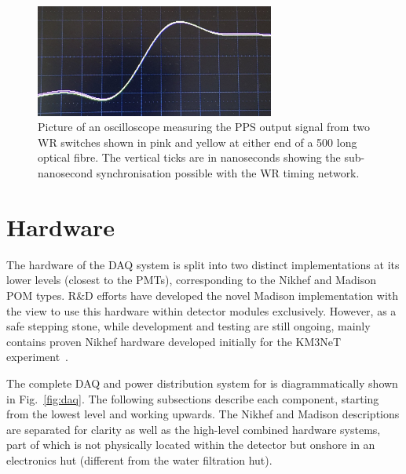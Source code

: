 \begin{figure} %
    \includegraphics[width=0.7\textwidth]{diagrams/5-daq/sync.jpg}
    \caption[Picture of White Rabbit timing synchronisation seen in \chips.]
    {Picture of an oscilloscope measuring the PPS output signal from two WR switches shown in pink
        and yellow at either end of a \unit{500}{} long optical fibre. The vertical
        ticks are in nanoseconds showing the sub-nanosecond synchronisation possible with the WR
        timing network.}
    \label{fig:sync}
\end{figure}

\section{Hardware} %
\label{sec:daq_hard} %

The hardware of the \chipsfive DAQ system is split into two distinct implementations at its lower
levels (closest to the PMTs), corresponding to the Nikhef and Madison POM types. \chips R\&D
efforts have developed the novel Madison implementation with the view to use this hardware within
detector modules exclusively. However, as a safe stepping stone, while development and testing are
still ongoing, \chipsfive mainly contains proven Nikhef hardware developed initially for the
KM3NeT experiment~\cite{adrian2016}.

The complete DAQ and power distribution system for \chipsfive is diagrammatically shown in
Fig.~\ref{fig:daq}. The following subsections describe each component, starting from the lowest
level and working upwards. The Nikhef and Madison descriptions are separated for clarity as well
as the high-level combined hardware systems, part of which is not physically located within the
detector but onshore in an electronics hut (different from the water filtration hut).

